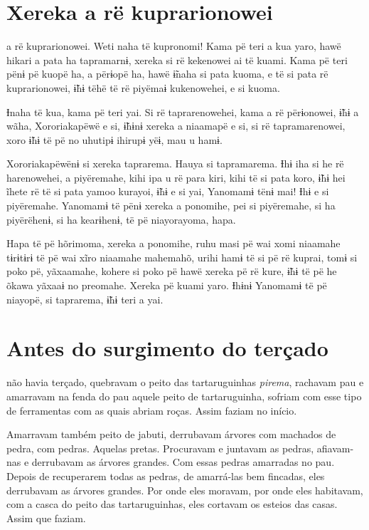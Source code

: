 \chapter{Xereka a rë kuprarionowei}
 
 a rë kuprarionowei. Weti naha të kupronomi! Kama pë teri a kua
yaro, hawë hikari a pata ha tapramarnɨ, xereka si rë kekenowei ai të
kuami. Kama pë teri pënɨ pë kuopë ha, a përɨopë ha, hawë ɨ̃naha si pata
kuoma, e të si pata rë kuprarionowei, ɨ̃hɨ tëhë të rë
piyëmaɨ kukenowehei, e si kuoma. 

Ɨnaha të kua, kama pë teri yai. Si rë taprarenowehei, kama a rë
 përɨonowei, ɨ̃hɨ a wãha, Xororiakapëwë e si, ɨ̃hɨnɨ xereka a niaamapë e
 si, si rë tapramarenowei, xoro ɨ̃hɨ të pë no uhutipɨ ihirupɨ yëɨ, mau u
 hamɨ.

Xororiakapëwënɨ si xereka taprarema. Hauya si tapramarema. Ɨhɨ iha si he
rë harenowehei, a piyëremahe, kihi ipa u rë para kiri, kihi të si pata
koro, ɨ̃hɨ hei ĩhete rë të si pata yamoo kurayoi, ɨ̃hɨ e si yai,
Yanomamɨ tënɨ mai! Ɨhɨ e si piyëremahe. Yanomamɨ të pënɨ xereka a
ponomihe, pei si piyëremahe, si ha piyërëhenɨ, si ha kearɨhenɨ, të pë
niayorayoma, hapa. 

Hapa të pë hõrimoma, xereka a ponomihe, ruhu masi pë wai xomi niaamahe
tɨrɨtɨrɨ të pë wai xĩro niaamahe mahemahõ, urihi hamɨ të si pë rë
kuprai, tomɨ si poko pë, yãxaamahe, kohere si poko pë hawë xereka pë rë
kure, ɨ̃hɨ të pë he õkawa yãxaaɨ no preomahe. Xereka pë kuami yaro.
Ɨhɨnɨ Yanomamɨ të pë niayopë, si taprarema, ɨ̃hɨ teri a yai.

\chapter{Antes do surgimento do terçado}
 
 não havia terçado, quebravam o peito das
tartaruguinhas \textit{pirema}, rachavam pau e amarravam na fenda do pau
aquele peito de tartaruguinha, sofriam com esse tipo de ferramentas com
as quais abriam roças. Assim faziam no início.

Amarravam também peito de jabuti, derrubavam árvores com machados de
pedra, com pedras. Aquelas pretas. Procuravam e juntavam as pedras,
afiavam-nas e derrubavam as árvores grandes. Com essas pedras amarradas
no pau. Depois de recuperarem todas as pedras, de amarrá-las bem
fincadas, eles derrubavam as árvores grandes. Por onde eles moravam, por
onde eles habitavam, com a casca do peito das tartaruguinhas, eles
cortavam os esteios das casas. Assim que faziam.

